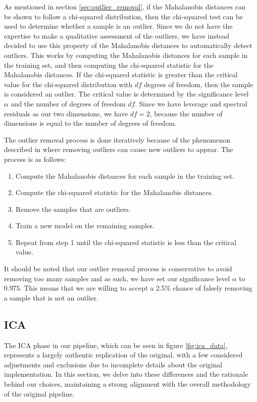 As mentioned in section \ref{sec:outlier_removal}, if the Mahalanobis distances can be shown to follow a chi-squared distribution, then the chi-squared test can be used to determine whether a sample is an outlier.
Since we do not have the expertise to make a qualitative assessment of the outliers, we have instead decided to use this property of the Mahalanobis distances to automatically detect outliers.
This works by computing the Mahalanobis distances for each sample in the training set, and then computing the chi-squared statistic for the Mahalanobis distances.
If the chi-squared statistic is greater than the critical value for the chi-squared distribution with $df$ degrees of freedom, then the sample is considered an outlier.
The critical value is determined by the significance level $\alpha$ and the number of degrees of freedom $df$.
Since we have leverage and spectral residuals as our two dimensions, we have $df = 2$, because the number of dimensions is equal to the number of degrees of freedom\cite{aggarwal_outlier_2017}.

The outlier removal process is done iteratively because of the phenomenon described in \citeauthor{cleggRecalibrationMarsScience2017} where removing outliers can cause new outliers to appear.
The process is as follows:
\begin{enumerate}
	\item Compute the Mahalanobis distances for each sample in the training set.
	\item Compute the chi-squared statistic for the Mahalanobis distances.
	\item Remove the samples that are outliers.
	\item Train a new model on the remaining samples.
	\item Repeat from step 1 until the chi-squared statistic is less than the critical value.
\end{enumerate}

It should be noted that our outlier removal process is conservative to avoid removing too many samples and as such, we have set our significance level $\alpha$ to 0.975.
This means that we are willing to accept a 2.5\% chance of falsely removing a sample that is not an outlier.

\subsection{ICA}
The ICA phase in our pipeline, which can be seen in figure \ref{fig:ica_data}, represents a largely authentic replication of the original, with a few considered adjustments and exclusions due to incomplete details about the original implementation.
In this section, we delve into these differences and the rationale behind our choices, maintaining a strong alignment with the overall methodology of the original pipeline.

